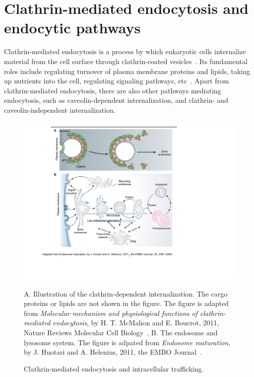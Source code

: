 \section{Clathrin-mediated endocytosis and endocytic pathways}
Clathrin-mediated endocytosis is a process by which eukaryotic cells internalize material from the cell surface through clathrin-coated vesicles~\cite{McMahon}. Its fundamental roles include regulating turnover of plasma membrane proteins and lipids, taking up nutrients into the cell, regulating signaling pathways, etc~\cite{McMahon,Humphries}. Apart from clathrin-mediated endocytosis, there are also other pathways mediating endocytosis, such as caveolin-dependent internalization, and clathrin- and caveolin-independent internalization.
\begin{figure}[h]
\centering
\includegraphics[scale=0.7]{Figures/endocytosis}
\caption{Clathrin-mediated endocytosis and intracellular trafficking.}
\vspace*{-3mm}
\small \justify
A. Illustration of the clathrin-dependent internalization. The cargo proteins or lipids are not shown in the figure. The figure is adapted from \textit{Molecular mechanism and physiological functions of clathrin-mediated endocytosis}, by H. T. McMahon and E. Boucrot, 2011, Nature Reviews Molecular Cell Biology~\cite{McMahon}. B. The endosome and lysosome system. The figure is adpated from \textit{Endosome maturation}, by J. Huotari and A. Helenius, 2011, the EMBO Journal~\cite{Huotari}. 
\label{fig:endocytosis}
\end{figure}

